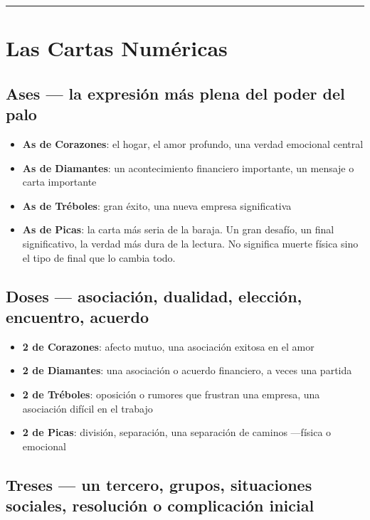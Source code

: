 \begin{center}\rule{0.5\linewidth}{0.5pt}\end{center}

\section{Las Cartas Numéricas}\label{the-number-cards}

\subsection{Ases --- la expresión más plena del poder del palo}\label{aces--the-fullest-expression-of-the-suits-power}

\begin{itemize}
\tightlist
\item
  \textbf{As de Corazones}: el hogar, el amor profundo, una verdad emocional central
\item
  \textbf{As de Diamantes}: un acontecimiento financiero importante, un mensaje o carta importante
\item
  \textbf{As de Tréboles}: gran éxito, una nueva empresa significativa
\item
  \textbf{As de Picas}: la carta más seria de la baraja. Un gran desafío, un final significativo, la verdad más dura de la lectura. No significa muerte física sino el tipo de final que lo cambia todo.
\end{itemize}

\subsection{Doses --- asociación, dualidad, elección, encuentro, acuerdo}\label{twos--partnership-duality-choice-meeting-agreement}

\begin{itemize}
\tightlist
\item
  \textbf{2 de Corazones}: afecto mutuo, una asociación exitosa en el amor
\item
  \textbf{2 de Diamantes}: una asociación o acuerdo financiero, a veces una partida
\item
  \textbf{2 de Tréboles}: oposición o rumores que frustran una empresa, una asociación difícil en el trabajo
\item
  \textbf{2 de Picas}: división, separación, una separación de caminos ---física o emocional
\end{itemize}

\subsection{Treses --- un tercero, grupos, situaciones sociales, resolución o complicación inicial}\label{threes--a-third-party-groups-social-situations-initial-resolution-or-complication}

